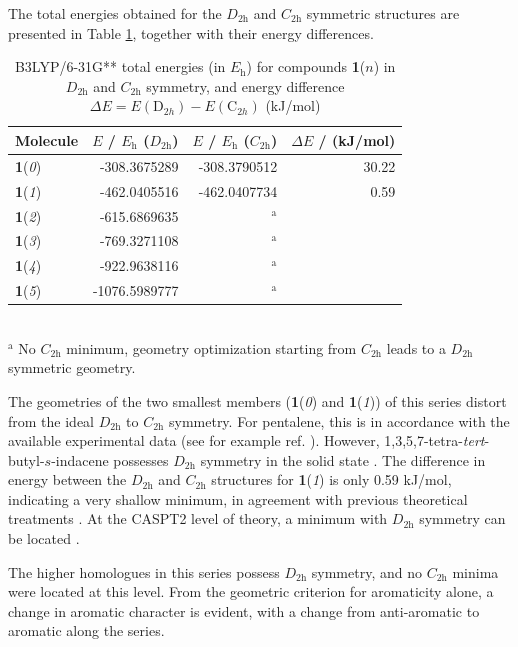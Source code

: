 The total energies obtained for the $D_\mathrm{2h}$ and $C_\mathrm{2h}$ symmetric structures are presented in Table \ref{ch7.tab01}, together with their energy differences.
\begin{table}[ht]
\caption{B3LYP/6-31G** total energies (in $E_\mathrm{h}$) for compounds \textbf{1}($n$) in $D_\mathrm{2h}$ and $C_\mathrm{2h}$ symmetry, and energy difference $\Delta E = E(\mathrm{D}_{2h})-  E(\mathrm{C}_{2h})$ (kJ/mol)}
\begin{center}
\begin{tabular}{l r r r }
\hline
Molecule &
$E$ / $E_\mathrm{h}$ ($D_\mathrm{2h}$)&
$E$ / $E_\mathrm{h}$ ($C_\mathrm{2h}$)&
$\Delta E$ / (kJ/mol)\\
\hline
\textbf{1}(\textit{0}) & -308.3675289 & -308.3790512 & 30.22\\
\textbf{1}(\textit{1}) & -462.0405516 & -462.0407734 & 0.59\\
\textbf{1}(\textit{2}) & -615.6869635 & ${}^\mathrm{a}$ &\\
\textbf{1}(\textit{3}) & -769.3271108 & ${}^\mathrm{a}$ &\\
\textbf{1}(\textit{4}) & -922.9638116 & ${}^\mathrm{a}$ &\\
\textbf{1}(\textit{5}) & -1076.5989777 & ${}^\mathrm{a}$ &\\
\hline
\end{tabular}
\\
\flushleft
${}^\mathrm{a}$ No $C_\mathrm{2h}$ minimum, geometry optimization starting from $C_\mathrm{2h}$ leads to a $D_\mathrm{2h}$ symmetric geometry.
\end{center}
\label{ch7.tab01}
\end{table}
The geometries of the two smallest members (\textbf{1}(\textit{0}) and \textbf{1}(\textit{1})) of this series distort from the ideal $D_\mathrm{2h}$ to $C_\mathrm{2h}$ symmetry. For pentalene, this is in accordance with the available experimental data (see for example ref.   \cite{r34}). However, 1,3,5,7-tetra-\textit{tert}-butyl-$s$-indacene possesses $D_\mathrm{2h}$ symmetry in the solid state  \cite{r07}. The difference in energy between the $D_\mathrm{2h}$ and $C_\mathrm{2h}$ structures for \textbf{1}(\textit{1}) is only 0.59 kJ/mol, indicating a very shallow minimum, in agreement with previous theoretical treatments  \cite{r10,r13,r14}. At the CASPT2 level of theory, a minimum with $D_\mathrm{2h}$ symmetry can be located  \cite{r01}.

The higher homologues in this series possess $D_\mathrm{2h}$ symmetry, and no $C_\mathrm{2h}$ minima were located at this level. From the geometric criterion for aromaticity alone, a change in aromatic character is evident, with a change from anti-aromatic to aromatic along the series.


